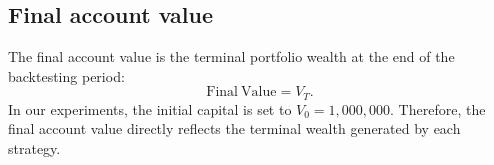 \documentclass[pdflatex,sn-mathphys-num]{sn-jnl}%
\theoremstyle{thmstyleone}%
\theoremstyle{thmstyletwo}%
\theoremstyle{thmstylethree}%
\begin{document}
\subsection{Final account value}

The final account value is the terminal portfolio wealth at the end of the backtesting period:
\begin{equation}
\mathrm{Final\ Value}=V_T .
\end{equation}
In our experiments, the initial capital is set to $V_0=1{,}000{,}000$.
Therefore, the final account value directly reflects the terminal wealth generated by each strategy.
\clearpage


\end{document}
